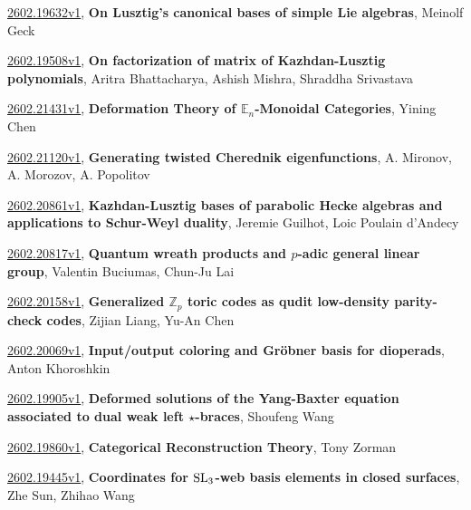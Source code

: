 \documentclass[9pt, a4paper]{article}
\theoremstyle{plain}
\theoremstyle{definition}
\theoremstyle{remark}
\newcommand{\arxiv}[3]{\href{https://arxiv.org/abs/#1}{#1}, \textbf{\textcolor{arxivblue}{#2}}, #3}
\begin{document}
\arxiv{2602.19632v1}{On Lusztig's canonical bases of simple Lie algebras}{Meinolf Geck}

\arxiv{2602.19508v1}{On factorization of matrix of Kazhdan-Lusztig polynomials}{Aritra Bhattacharya, Ashish Mishra, Shraddha Srivastava}

\arxiv{2602.21431v1}{Deformation Theory of $\mathbb{E}_n$-Monoidal Categories}{Yining Chen}

\arxiv{2602.21120v1}{Generating twisted Cherednik eigenfunctions}{A. Mironov, A. Morozov, A. Popolitov}

\arxiv{2602.20861v1}{Kazhdan-Lusztig bases of parabolic Hecke algebras and applications to Schur-Weyl duality}{Jeremie Guilhot, Loic Poulain d'Andecy}

\arxiv{2602.20817v1}{Quantum wreath products and $p$-adic general linear group}{Valentin Buciumas, Chun-Ju Lai}

\arxiv{2602.20158v1}{Generalized $\mathbb{Z}_p$ toric codes as qudit low-density parity-check codes}{Zijian Liang, Yu-An Chen}

\arxiv{2602.20069v1}{Input/output coloring and Gröbner basis for dioperads}{Anton Khoroshkin}

\arxiv{2602.19905v1}{Deformed solutions of the Yang-Baxter equation associated to dual weak left $\star$-braces}{Shoufeng Wang}

\arxiv{2602.19860v1}{Categorical Reconstruction Theory}{Tony Zorman}

\arxiv{2602.19445v1}{Coordinates for ${\rm SL}_3$-web basis elements in closed surfaces}{Zhe Sun, Zhihao Wang}

\end{document}
